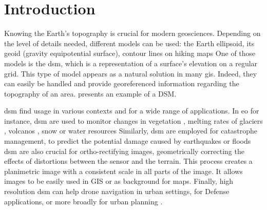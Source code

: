 \chapter*{Introduction}
Knowing the Earth's topography is crucial for modern geosciences. Depending on the level of details needed, different models can be used: the Earth ellipsoid, its geoid (gravity equipotential surface), contour lines on hiking maps \etc One of those models is the \acrfull{dsm}, which is a representation of a surface's elevation on a regular grid. This type of model appears as a natural solution in many \acrfull{gis}. Indeed, they can easily be handled and provide georeferenced information regarding the topography of an area.  presents an example of a DSM.

\acrshort{dsm} find usage in various contexts and for a wide range of applications. In \acrfull{eo} for instance, \acrshort{dsm} are used to monitor changes in vegetation \cite{sadeghi_canopy_2016}, melting rates of glaciers \cite{berthier_glacier_2014, rieg_pleiades_2018}, volcanos \cite{ganci_data_2022}, snow or water resources \cite{marti_mapping_2016, gascoin_theia_2019, yamazaki_merit_2019} \etc{} Similarly, \acrshort{dsm} are employed for catastrophe management, to predict the potential damage caused by earthquakes or floods \cite{jenkins_physics-based_2023} \etc{} \acrshort{dsm} are also crucial for ortho-rectifying images, \ie geometrically correcting the effects of distortions between the sensor and the terrain. This process creates a planimetric image with a consistent scale in all parts of the image. It allows images to be easily used in GIS or as background for maps. Finally, high resolution \acrshort{dsm} can help drone navigation in urban settings, for Defense applications, or more broadly for urban planning \cite{velazco_3d_2012}.

